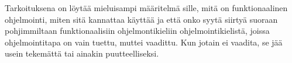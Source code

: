 Tarkoituksena on löytää mieluisampi määritelmä sille, mitä on funktionaalinen ohjelmointi, miten sitä kannattaa käyttää ja että onko syytä siirtyä suoraan pohjimmiltaan funktionaalisiin ohjelmontikieliin ohjelmointikielistä, joissa ohjelmointitapa on vain tuettu, muttei vaadittu. Kun jotain ei vaadita, se jää usein tekemättä tai ainakin puutteelliseksi.
